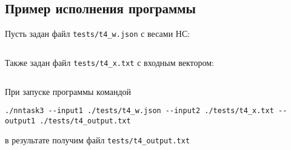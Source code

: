 \documentclass[spec, och, labwork]{SCWorks}
\begin{document}
\subsection*{Пример исполнения программы}

Пусть задан файл \verb|tests/t4_w.json| с весами НС:
\inputminted{xml}{../tests/t4_w.json}

Также задан файл \verb|tests/t4_x.txt| с входным вектором:
\inputminted{json}{../tests/t4_x.txt}

При запуске программы командой
\begin{verbatim}
./nntask3 --input1 ./tests/t4_w.json --input2 ./tests/t4_x.txt --output1 ./tests/t4_output.txt
\end{verbatim}
в результате получим файл \verb|tests/t4_output.txt|
\inputminted{xml}{../tests/t4_output.txt}
\end{document}

